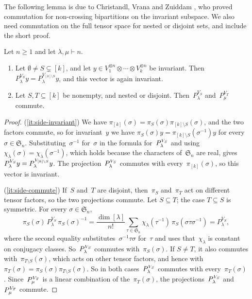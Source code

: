 \documentclass[11pt,letterpaper]{article}
\begin{document}
The following lemma is due to Christandl, Vrana and Zuiddam \cite[Lemmas~3.12 and~3.13]{MR4495838}, who proved commutation for non-crossing bipartitions on the invariant subspace. We also need commutation on the full tensor space for nested or disjoint sets, and include the short proof.
\begin{lemma}\label{lem:side}
Let $n \geq 1$ and let $\lambda, \mu \vdash n$.
\begin{enumerate}[\upshape(i)]
\item\label{it:side-invariant} Let $\emptyset \neq S \subsetneq [k]$, and let $y \in V_1^{\otimes n} \otimes \cdots \otimes V_k^{\otimes n}$ be invariant. Then $P^{V_S}_\lambda y = P^{V_{[k] \setminus S}}_\lambda y$, and this vector is again invariant.
\item\label{it:side-commute} Let $S, T \subseteq [k]$ be nonempty, and nested or disjoint. Then~$P^{V_S}_\lambda$ and~$P^{V_T}_\mu$ commute.
\end{enumerate}
\end{lemma}
\begin{proof}
(\ref{it:side-invariant}) We have $\pi_{[k]}(\sigma) = \pi_S(\sigma) \pi_{[k] \setminus S}(\sigma)$, and the two factors commute, so for invariant~$y$ we have $\pi_S(\sigma) y = \pi_{[k] \setminus S}(\sigma^{-1}) y$ for every $\sigma \in \mathfrak{S}_n$. Substituting~$\sigma^{-1}$ for~$\sigma$ in the formula for~$P^{\smash[t]{V_S}}_\lambda$ and using $\chi_\lambda(\sigma) = \chi_\lambda(\sigma^{-1})$, which holds because the characters of~$\mathfrak{S}_n$ are real, gives $P^{\smash[t]{V_S}}_\lambda y = P^{\smash[t]{V_{[k] \setminus S}}}_\lambda y$. The projection~$P^{\smash[t]{V_S}}_\lambda$ commutes with every~$\pi_{[k]}(\sigma)$, so this vector is invariant.

(\ref{it:side-commute}) If~$S$ and~$T$ are disjoint, then~$\pi_S$ and~$\pi_T$ act on different tensor factors, so the two projections commute. Let $S \subseteq T$; the case $T \subseteq S$ is symmetric. For every $\sigma \in \mathfrak{S}_n$,
\[
\pi_S(\sigma)\, P^{V_S}_\lambda\, \pi_S(\sigma)^{-1} = \frac{\dim[\lambda]}{n!} \sum_{\tau \in \mathfrak{S}_n} \chi_\lambda(\tau^{-1})\, \pi_S(\sigma \tau \sigma^{-1}) = P^{V_S}_\lambda,
\]
where the second equality substitutes~$\sigma^{-1} \tau \sigma$ for~$\tau$ and uses that~$\chi_\lambda$ is constant on conjugacy classes. So~$P^{\smash[t]{V_S}}_\lambda$ commutes with~$\pi_S(\sigma)$. If $S \neq T$, it also commutes with~$\pi_{T \setminus S}(\sigma)$, which acts on other tensor factors, and hence with $\pi_T(\sigma) = \pi_S(\sigma) \pi_{T \setminus S}(\sigma)$. So in both cases~$P^{\smash[t]{V_S}}_\lambda$ commutes with every~$\pi_T(\sigma)$. Since~$P^{\smash[t]{V_T}}_\mu$ is a linear combination of the~$\pi_T(\sigma)$, the projections~$P^{\smash[t]{V_S}}_\lambda$ and~$P^{\smash[t]{V_T}}_\mu$ commute.
\end{proof}
\end{document}

